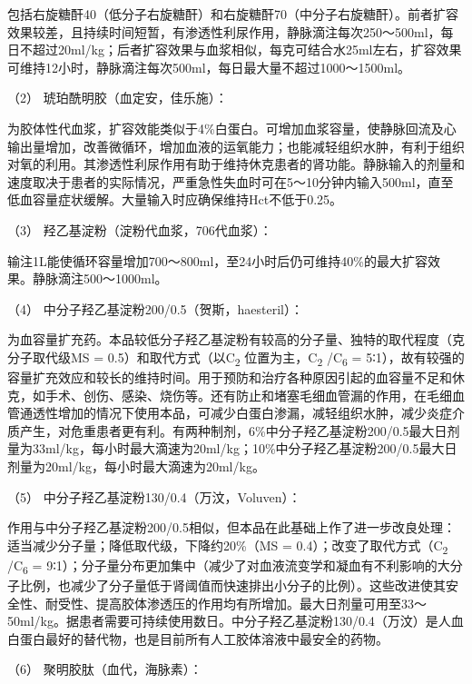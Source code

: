 包括右旋糖酐40（低分子右旋糖酐）和右旋糖酐70（中分子右旋糖酐）。前者扩容效果较差，且持续时间短暂，有渗透性利尿作用，静脉滴注每次250～500ml，每日不超过20ml/kg；后者扩容效果与血浆相似，每克可结合水25ml左右，扩容效果可维持12小时，静脉滴注每次500ml，每日最大量不超过1000～1500ml。

\hypertarget{text00061.htmlux5cux23CHP2-4-3-2-2-2-2}{}
（2） 琥珀酰明胶（血定安，佳乐施）：

为胶体性代血浆，扩容效能类似于4\%白蛋白。可增加血浆容量，使静脉回流及心输出量增加，改善微循环，增加血液的运氧能力；也能减轻组织水肿，有利于组织对氧的利用。其渗透性利尿作用有助于维持休克患者的肾功能。静脉输入的剂量和速度取决于患者的实际情况，严重急性失血时可在5～10分钟内输入500ml，直至低血容量症状缓解。大量输入时应确保维持Hct不低于0.25。

\hypertarget{text00061.htmlux5cux23CHP2-4-3-2-2-2-3}{}
（3） 羟乙基淀粉（淀粉代血浆，706代血浆）：

输注1L能使循环容量增加700～800ml，至24小时后仍可维持40\%的最大扩容效果。静脉滴注500～1000ml。

\hypertarget{text00061.htmlux5cux23CHP2-4-3-2-2-2-4}{}
（4） 中分子羟乙基淀粉200/0.5（贺斯，haesteril）：

为血容量扩充药。本品较低分子羟乙基淀粉有较高的分子量、独特的取代程度（克分子取代级MS
= 0.5）和取代方式（以C\textsubscript{2} 位置为主，C\textsubscript{2}
/C\textsubscript{6} =
5∶1），故有较强的容量扩充效应和较长的维持时间。用于预防和治疗各种原因引起的血容量不足和休克，如手术、创伤、感染、烧伤等。还有防止和堵塞毛细血管漏的作用，在毛细血管通透性增加的情况下使用本品，可减少白蛋白渗漏，减轻组织水肿，减少炎症介质产生，对危重患者更有利。有两种制剂，6\%中分子羟乙基淀粉200/0.5最大日剂量为33ml/kg，每小时最大滴速为20ml/kg；10\%中分子羟乙基淀粉200/0.5最大日剂量为20ml/kg，每小时最大滴速为20ml/kg。

\hypertarget{text00061.htmlux5cux23CHP2-4-3-2-2-2-5}{}
（5） 中分子羟乙基淀粉130/0.4（万汶，Voluven）：

作用与中分子羟乙基淀粉200/0.5相似，但本品在此基础上作了进一步改良处理：适当减少分子量；降低取代级，下降约20\%（MS
= 0.4）；改变了取代方式（C\textsubscript{2} /C\textsubscript{6} =
9∶1）；分子量分布更加集中（减少了对血液流变学和凝血有不利影响的大分子比例，也减少了分子量低于肾阈值而快速排出小分子的比例）。这些改进使其安全性、耐受性、提高胶体渗透压的作用均有所增加。最大日剂量可用至33～50ml/kg。据患者需要可持续使用数日。中分子羟乙基淀粉130/0.4（万汶）是人血白蛋白最好的替代物，也是目前所有人工胶体溶液中最安全的药物。

\hypertarget{text00061.htmlux5cux23CHP2-4-3-2-2-2-6}{}
（6） 聚明胶肽（血代，海脉素）：

